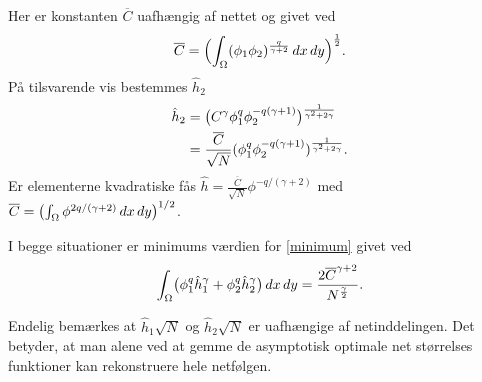 Her er konstanten $\overline{C}$ uafhængig af nettet og givet ved
\begin{equation} \label{valueofC}
  \overline{C} = \Bigl( \int_{\Omega} (\phi_1 \phi_2)^{\frac{q}
  {\gamma +2}}\, dx\, dy \Bigr)^{\frac{1}{2}}.
\end{equation}
På tilsvarende vis bestemmes $\hat{h}_2$
\begin{align} \label{opt-h2}
  \hat{h}_2 &= \bigl( C^\gamma \phi_1^q \phi_2^{-q(\gamma +1)} 
    \bigr)^{\frac{1}{\gamma^2 +2\gamma}} \\
  &= \frac{\overline{C}}{\sqrt{N}} ( \phi_1^q \phi_2^{-q(\gamma +1)}
     )^{\frac{1}{\gamma^2 +2\gamma}}. \notag
\end{align}
Er elementerne kvadratiske fås
$\hat{h}=\frac{\overline{C}}{\sqrt{N}}\phi^{-q/(\gamma +2)}$ med
$\overline{C}=\bigl( \int_{\Omega} \phi^{2q/(\gamma +2)}\, dx\, dy
\bigr)^{1/2}$.

I begge situationer er minimums værdien for \eqref{minimum} givet ved
\begin{equation} \label{min-value}
  \int_{\Omega} \bigl( \phi_1^q \hat{h}_1^\gamma +
  \phi_2^q \hat{h}_2^\gamma \bigr)\, dx\, dy = 
  \frac{2\overline{C}^{\gamma +2}}{N^{\frac{\gamma}{2}}}.
\end{equation}

Endelig bemærkes at $\hat{h}_1\sqrt{N}$ og $\hat{h}_2\sqrt{N}$ er
uafhængige af netinddelingen. Det betyder, at man alene ved at gemme
de asymptotisk optimale net størrelses funktioner kan rekonstruere hele netfølgen.

